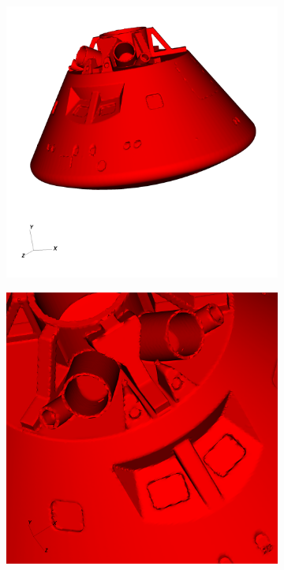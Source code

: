 \documentclass[final,3p,times,twocolumn]{elsarticle}
\begin{document}
\begin{figure}
\centering
        \begin{subfigure}[b]{0.475\textwidth}
            \centering
            \includegraphics[width=\textwidth]{visit0003.png}
            \caption{}    
            \label{ef1}
        \end{subfigure}
        \hfill
        \begin{subfigure}[b]{0.475\textwidth}  
            \centering 
            \includegraphics[width=\textwidth]{visit0000.png}

\end{subfigure}
\end{figure}
\end{document}
